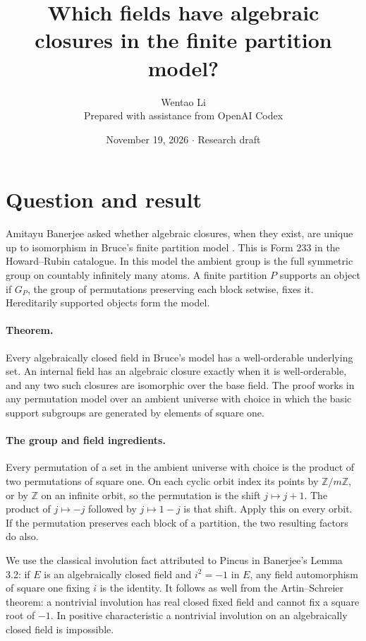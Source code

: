 \documentclass[11pt]{article}
\title{Which fields have algebraic closures in the finite partition model?}
\author{Wentao Li\\{\small Prepared with assistance from OpenAI Codex}}
\date{November 19, 2026 \quad $\cdot$ \quad Research draft}
\begin{document}
\maketitle
\section*{Question and result}
Amitayu Banerjee asked whether algebraic closures, when they exist, are unique up to isomorphism in Bruce's finite partition model \cite{ban}. This is Form 233 in the Howard--Rubin catalogue. In this model the ambient group is the full symmetric group on countably infinitely many atoms. A finite partition $P$ supports an object if $G_P$, the group of permutations preserving each block setwise, fixes it. Hereditarily supported objects form the model.

\paragraph{Theorem.} Every algebraically closed field in Bruce's model has a well-orderable underlying set. An internal field has an algebraic closure exactly when it is well-orderable, and any two such closures are isomorphic over the base field. The proof works in any permutation model over an ambient universe with choice in which the basic support subgroups are generated by elements of square one.

\paragraph{The group and field ingredients.} Every permutation of a set in the ambient universe with choice is the product of two permutations of square one. On each cyclic orbit index its points by $\mathbb Z/m\mathbb Z$, or by $\mathbb Z$ on an infinite orbit, so the permutation is the shift $j\mapsto j+1$. The product of $j\mapsto-j$ followed by $j\mapsto1-j$ is that shift. Apply this on every orbit. If the permutation preserves each block of a partition, the two resulting factors do also.

We use the classical involution fact attributed to Pincus in Banerjee's Lemma 3.2: if $E$ is an algebraically closed field and $i^2=-1$ in $E$, any field automorphism of square one fixing $i$ is the identity. It follows as well from the Artin--Schreier theorem: a nontrivial involution has real closed fixed field and cannot fix a square root of $-1$. In positive characteristic a nontrivial involution on an algebraically closed field is impossible.
\end{document}
